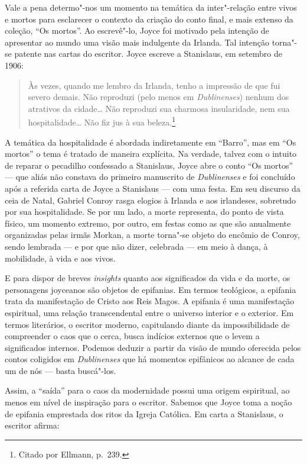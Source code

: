 Vale a pena determo"-nos um momento na temática da inter"-relação entre vivos e
mortos para esclarecer o contexto da criação do conto final, e mais extenso da
coleção, “Os mortos”. Ao escrevê"-lo, Joyce foi motivado pela intenção
de apresentar ao mundo uma visão mais indulgente da Irlanda. Tal intenção
torna"-se patente nas cartas do escritor. Joyce escreve a Stanislaus, em
setembro de 1906: 

\begin{quote}
Às vezes, quando me lembro da Irlanda, tenho a impressão de
que fui severo demais. Não reproduzi (pelo menos em \textit{Dublinenses}) nenhum
dos atrativos da cidade\ldots{} Não reproduzi sua charmosa insularidade, nem sua
hospitalidade\ldots{} Não fiz jus à sua beleza.\footnote{ Citado por Ellmann, p.~239.}
\end{quote}

A temática da hospitalidade é abordada indiretamente em “Barro”, mas em “Os
mortos” o tema é tratado de maneira explícita. Na verdade, talvez com o intuito
de reparar o pecadilho confessado a Stanislaus, Joyce abre o conto “Os mortos”
--- que aliás não constava do primeiro manuscrito de \textit{Dublinenses} e
foi concluído após a referida carta de Joyce a Stanislaus --- com uma festa.
Em seu discurso da ceia de Natal, Gabriel Conroy rasga elogios à Irlanda e aos
irlandeses, sobretudo por sua hospitalidade. Se por um lado, a morte
representa, do ponto de vista físico, um momento extremo, por outro, em festas
como as que são anualmente organizadas pelas irmãs Morkan, a morte torna"-se
objeto do encômio de Conroy, sendo lembrada --- e por que não dizer, celebrada ---
em meio à dança, à mobilidade, à vida e aos vivos.

E para dispor de breves \textit{insights} quanto aos significados da vida e da
morte, os personagens joyceanos são objetos de epifanias. Em termos teológicos,
a epifania trata da manifestação de Cristo aos Reis Magos.  A epifania é uma
manifestação espiritual, uma relação transcendental entre o universo interior e
o exterior. Em termos literários, o escritor moderno, capitulando diante da
impossibilidade de compreender o caos que o cerca, busca indícios externos que
o levem a significados internos. Podemos deduzir a partir da visão de mundo
oferecida pelos contos coligidos em \textit{Dublinenses} que há momentos
epifânicos ao alcance de cada um de nós --- basta buscá"-los.

Assim, a “saída” para o caos da modernidade possui uma origem espiritual, ao
menos em nível de inspiração para o escritor. Sabemos que Joyce toma a noção de
epifania emprestada dos ritos da Igreja Católica. Em carta a Stanislaus, o
escritor afirma: 

